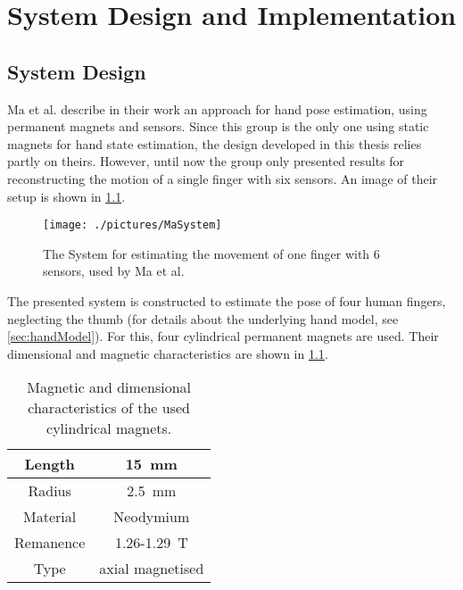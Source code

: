 \lhead[\chaptername~\thechapter]{\rightmark}

\rhead[\leftmark]{}

\lfoot[\thepage]{}

\cfoot{}

\rfoot[]{\thepage}

\chapter{System Design and Implementation} \label{cha:sysDesign}

\section{System Design} \label{cha:design}

Ma et al. \cite{ma2010magnetic} describe in their work an approach for hand pose estimation, using permanent magnets and sensors. Since this group is the only one using static magnets for hand state estimation, the design developed in this thesis relies partly on theirs. However, until now the group only presented results for reconstructing the motion of a single finger with six sensors. An image of their setup is shown in \ref{fig:MaSystem}.
\begin{figure}[h]
\centering
\texttt{[image: ./pictures/MaSystem]}
\caption[Magnetic system, developed by Ma et al.]
{The System for estimating the movement of one finger with 6 sensors, used by Ma et al. \cite{ma2010magnetic}}
\label{fig:MaSystem}
\end{figure}
The presented system is constructed to estimate the pose of four human fingers, neglecting the thumb (for details about the underlying hand model, see \ref{sec:handModel}). For this, four cylindrical permanent magnets are used. Their dimensional and magnetic characteristics are shown in \ref{tab:magDimensions}.
\begin{table}[h]
\centering
\begin{tabular}{c|c}
	Length & \SI{15}{\mm} \\ \hline
	Radius & \SI{2.5}{\mm} \\ \hline
	Material & Neodymium \\ \hline
	Remanence & 1.26-\SI{1.29}{\tesla} \\ \hline
	Type & axial magnetised \\ %
\end{tabular}
\caption[Magnetic properties]{Magnetic and dimensional characteristics of the used cylindrical magnets.}
\label{tab:magDimensions}
\end{table}
